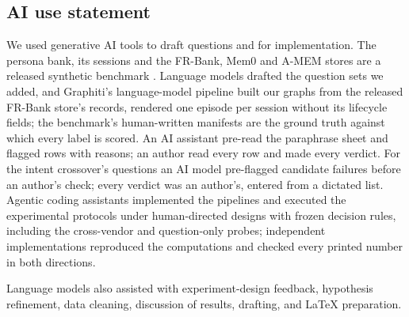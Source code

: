 \documentclass{article}
\begin{document}
\subsection*{AI use statement}

We used generative AI tools to draft questions and for implementation.
The persona bank, its sessions and the FR-Bank, Mem0 and A-MEM stores are a released synthetic benchmark \citep{fr}.
Language models drafted the question sets we added, and Graphiti's language-model pipeline built our graphs from the released FR-Bank store's records, rendered one episode per session without its lifecycle fields; the benchmark's human-written manifests are the ground truth against which every label is scored.
An AI assistant pre-read the paraphrase sheet and flagged rows with reasons; an author read every row and made every verdict.
For the intent crossover's questions an AI model pre-flagged candidate failures before an author's check; every verdict was an author's, entered from a dictated list.
Agentic coding assistants implemented the pipelines and executed the experimental protocols under human-directed designs with frozen decision rules, including the cross-vendor and question-only probes; independent implementations reproduced the computations and checked every printed number in both directions.

Language models also assisted with experiment-design feedback, hypothesis refinement, data cleaning, discussion of results, drafting, and \LaTeX{} preparation.
\end{document}
